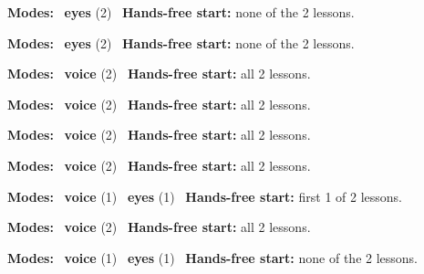 \expandafter\def\csname hlchaptermodality6\endcsname{%
  {\small\noindent
    \textbf{Modes:} \hlsightsign{}~\textbf{eyes} (2)\quad
    \hlvoicesign{}~\textbf{Hands-free start:} none of the 2 lessons.%
    \par}\medskip
}

\expandafter\def\csname hlchaptermodality7\endcsname{%
  {\small\noindent
    \textbf{Modes:} \hlsightsign{}~\textbf{eyes} (2)\quad
    \hlvoicesign{}~\textbf{Hands-free start:} none of the 2 lessons.%
    \par}\medskip
}

\expandafter\def\csname hlchaptermodality8\endcsname{%
  {\small\noindent
    \textbf{Modes:} \hlvoicesign{}~\textbf{voice} (2)\quad
    \hlvoicesign{}~\textbf{Hands-free start:} all 2 lessons.%
    \par}\medskip
}

\expandafter\def\csname hlchaptermodality9\endcsname{%
  {\small\noindent
    \textbf{Modes:} \hlvoicesign{}~\textbf{voice} (2)\quad
    \hlvoicesign{}~\textbf{Hands-free start:} all 2 lessons.%
    \par}\medskip
}

\expandafter\def\csname hlchaptermodality10\endcsname{%
  {\small\noindent
    \textbf{Modes:} \hlvoicesign{}~\textbf{voice} (2)\quad
    \hlvoicesign{}~\textbf{Hands-free start:} all 2 lessons.%
    \par}\medskip
}

\expandafter\def\csname hlchaptermodality11\endcsname{%
  {\small\noindent
    \textbf{Modes:} \hlvoicesign{}~\textbf{voice} (2)\quad
    \hlvoicesign{}~\textbf{Hands-free start:} all 2 lessons.%
    \par}\medskip
}

\expandafter\def\csname hlchaptermodality12\endcsname{%
  {\small\noindent
    \textbf{Modes:} \hlvoicesign{}~\textbf{voice} (1) \quad \hlsightsign{}~\textbf{eyes} (1)\quad
    \hlvoicesign{}~\textbf{Hands-free start:} first 1 of 2 lessons.%
    \par}\medskip
}

\expandafter\def\csname hlchaptermodality13\endcsname{%
  {\small\noindent
    \textbf{Modes:} \hlvoicesign{}~\textbf{voice} (2)\quad
    \hlvoicesign{}~\textbf{Hands-free start:} all 2 lessons.%
    \par}\medskip
}

\expandafter\def\csname hlchaptermodality14\endcsname{%
  {\small\noindent
    \textbf{Modes:} \hlvoicesign{}~\textbf{voice} (1) \quad \hlsightsign{}~\textbf{eyes} (1)\quad
    \hlvoicesign{}~\textbf{Hands-free start:} none of the 2 lessons.%
    \par}\medskip
}

